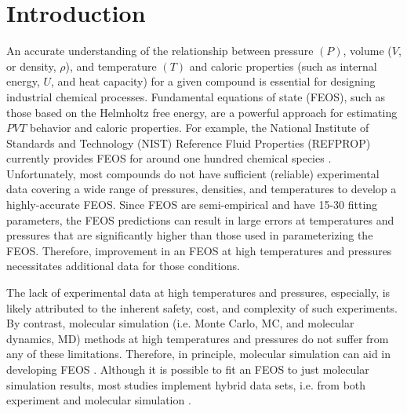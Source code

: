 \documentclass[preprint,letterpaper,floatfix,citeautoscript,aip,jcp]{revtex4-1}
\begin{document}
\section{Introduction}

An accurate understanding of the relationship between pressure $(P)$, volume ($V$, or density, $\rho$), and temperature $(T)$ and caloric properties (such as internal energy, $U$, and heat capacity) for a given compound is essential for designing industrial chemical processes. Fundamental equations of state (FEOS), such as those based on the Helmholtz free energy, are a powerful approach for estimating $PVT$ behavior and caloric properties. For example, the National Institute of Standards and Technology (NIST) Reference Fluid Properties (REFPROP) currently provides FEOS for around one hundred chemical species \cite{LEMMON-RP91}. Unfortunately, most compounds do not have sufficient (reliable) experimental data covering a wide range of pressures, densities, and temperatures to develop a highly-accurate FEOS. Since FEOS are semi-empirical and have 15-30 fitting parameters, the FEOS predictions can result in large errors at temperatures and pressures that are significantly higher than those used in parameterizing the FEOS. Therefore, improvement in an FEOS at high temperatures and pressures necessitates additional data for those conditions.

The lack of experimental data at high temperatures and pressures, especially, is likely attributed to the inherent safety, cost, and complexity of such experiments. By contrast, molecular simulation (i.e. Monte Carlo, MC, and molecular dynamics, MD) methods at high temperatures and pressures do not suffer from any of these limitations. Therefore, in principle, molecular simulation can aid in developing FEOS \cite{Thol2016_LJ,Thol_LJTS,Rutkai2017,Lustig2015,Rutkai2015}. Although it is possible to fit an FEOS to just molecular simulation results, most studies implement hybrid data sets, i.e. from both experiment and molecular simulation \cite{Rutkai2013}.
\end{document}
